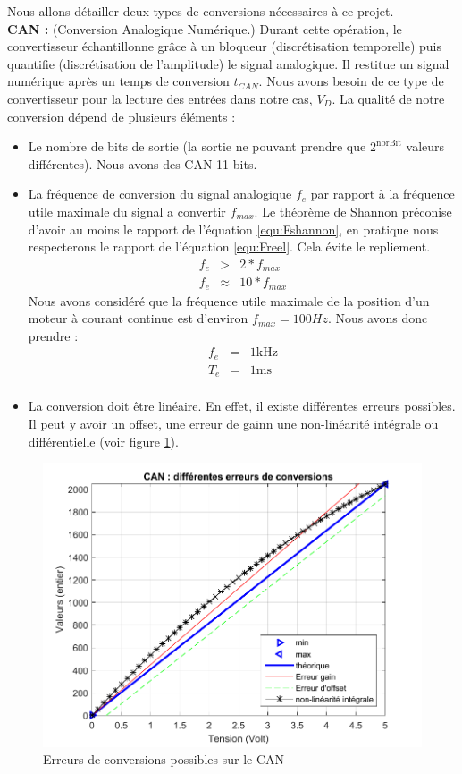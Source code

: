 Nous allons détailler deux types de conversions nécessaires à ce projet. \\
\hspace{3mm} \textbf{CAN :} (Conversion Analogique Numérique.) Durant cette opération, le convertisseur échantillonne grâce à un bloqueur (discrétisation temporelle) puis quantifie (discrétisation de l'amplitude) le signal analogique. Il restitue un signal numérique après un temps de conversion $t_{CAN}$. Nous avons besoin de ce type de convertisseur pour la lecture des entrées dans notre cas, $V_{D}$. La qualité de notre conversion dépend de plusieurs éléments : 
\begin{itemize}
\item Le nombre de bits de sortie (la sortie ne pouvant prendre que $2^{\text{nbrBit}}$ valeurs différentes). Nous avons des CAN 11 bits.
\item La fréquence de conversion du signal analogique $f_{e}$ par rapport à la fréquence utile maximale du signal a convertir $f_{max}$. Le théorème de Shannon préconise d'avoir au moins le rapport de l'équation \ref{equ:Fshannon}, en pratique nous respecterons le rapport de l'équation \ref{equ:Freel}. Cela évite le repliement.
\begin{eqnarray}
\label{equ:Fshannon} f_e &>& 2*f_{max}\\
\label{equ:Freel} f_e & \approx & 10*f_{max}
\end{eqnarray}
Nous avons considéré que la fréquence utile maximale de la position d'un moteur à courant continue est d'environ $f_{max} = 100Hz$. Nous avons donc prendre :
\begin{eqnarray}
f_e &=& 1\text{kHz}\\
\label{equ:Te} T_e &=& 1 \text{ms}\\
\end{eqnarray}
\item La conversion doit être linéaire. En effet, il existe différentes erreurs possibles. Il peut y avoir un offset, une erreur de gainn une non-linéarité intégrale ou différentielle (voir figure \ref{fig:errCAN}).
\end{itemize}
\begin{figure}[!ht]
\centering 
\includegraphics[width=.6\textwidth]{./V/images/CAN.pdf}
\caption{\label{fig:errCAN}Erreurs de conversions possibles sur le CAN}
\end{figure}
